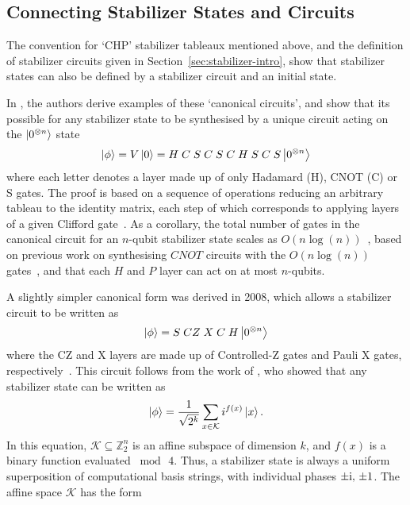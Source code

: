 \subsection{Connecting Stabilizer States and Circuits}
The convention for `CHP' stabilizer tableaux mentioned above, and the definition of stabilizer circuits given in Section~\ref{sec:stabilizer-intro}, show that stabilizer states can also be defined by a stabilizer circuit and an initial state.\par
In \cite{Aaronson2004}, the authors derive examples of these `canonical circuits', and show that its possible for any stabilizer state to be synthesised by a unique circuit acting on the $\ket{0^{\otimes n}}$ state
\begin{equation}
    \ket{\phi} = V\ket{0} = H\;C\;S\;C\;S\;C \;H \; S \;C \;S \ket{0^{\otimes n}}\label{eq:chpcirc}
\end{equation}
where each letter denotes a layer made up of only Hadamard (H), CNOT (C) or S gates. The proof is based on  a sequence of operations reducing an arbitrary tableau to the identity matrix, each step of which corresponds to applying layers of a given Clifford gate~\cite{Aaronson2004}. As a corollary, the total number of gates in the canonical circuit for an $n$-qubit stabilizer state scales as $O(n\log (n))$~\cite{Aaronson2004}, based on previous work on synthesising $CNOT$ circuits with the $O(n\log (n))$ gates~\cite{Patel2003}, and that each $H$ and $P$ layer can act on at most $n$-qubits.\par
A slightly simpler canonical form was derived in 2008, which allows a stabilizer circuit to be written as
\begin{equation}
    \ket{\phi} = S\;CZ\;X\;C\;H \ket{0^{\otimes n}} \label{eq:affinecirc}
\end{equation}
where the CZ and X layers are made up of Controlled-Z gates and Pauli X gates, respectively~\cite{VandenNest2008}. This circuit follows from the work of \cite{Dehaene2003}, who showed that any stabilizer state can be written as
\begin{equation}
    \ket{\phi} = \frac{1}{\sqrt{2^{k}}}\sum_{x\in\mathcal{K}} i^{f(x)}\ket{x}.\label{eq:affineform}
\end{equation}
In this equation, $\mathcal{K}\subseteq\mathbb{Z}_{2}^{n}$ is an affine subspace of dimension $k$, and $f(x)$ is a binary  function evaluated $\bmod\,4$. Thus, a stabilizer state is always a uniform superposition of computational basis strings, with individual phases $\pm \mathrm{i},\,\pm 1$. The affine space $\mathcal{K}$ has the form
